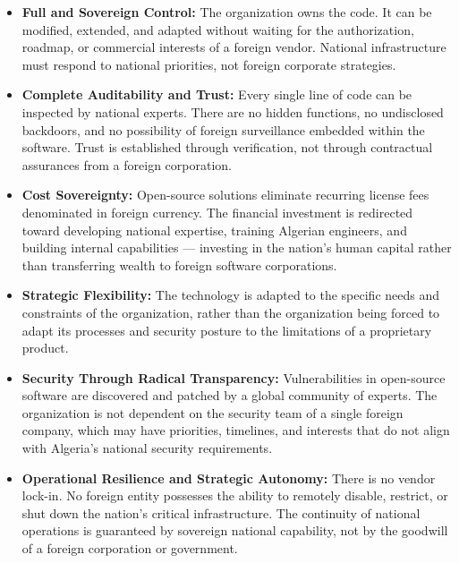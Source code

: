 \begin{itemize}
    \item \textbf{Full and Sovereign Control:} \hspace{0.2cm} The organization owns the code. It can be modified, extended, and adapted without waiting for the authorization, roadmap, or commercial interests of a foreign vendor. National infrastructure must respond to national priorities, not foreign corporate strategies.
    
    \item \textbf{Complete Auditability and Trust:} \hspace{0.2cm} Every single line of code can be inspected by national experts. There are no hidden functions, no undisclosed backdoors, and no possibility of foreign surveillance embedded within the software. Trust is established through verification, not through contractual assurances from a foreign corporation.
    
    \item \textbf{Cost Sovereignty:} \hspace{0.2cm} Open-source solutions eliminate recurring license fees denominated in foreign currency. The financial investment is redirected toward developing national expertise, training Algerian engineers, and building internal capabilities — investing in the nation's human capital rather than transferring wealth to foreign software corporations.
    
    \item \textbf{Strategic Flexibility:} \hspace{0.2cm} The technology is adapted to the specific needs and constraints of the organization, rather than the organization being forced to adapt its processes and security posture to the limitations of a proprietary product.
    
    \item \textbf{Security Through Radical Transparency:} \hspace{0.2cm} Vulnerabilities in open-source software are discovered and patched by a global community of experts. The organization is not dependent on the security team of a single foreign company, which may have priorities, timelines, and interests that do not align with Algeria's national security requirements.
    
    \item \hspace{0.6cm}\textbf{Operational Resilience and Strategic Autonomy:} There is no vendor lock-in. No foreign entity possesses the ability to remotely disable, restrict, or shut down the nation's critical infrastructure. The continuity of national operations is guaranteed by sovereign national capability, not by the goodwill of a foreign corporation or government.
    

\end{itemize}
